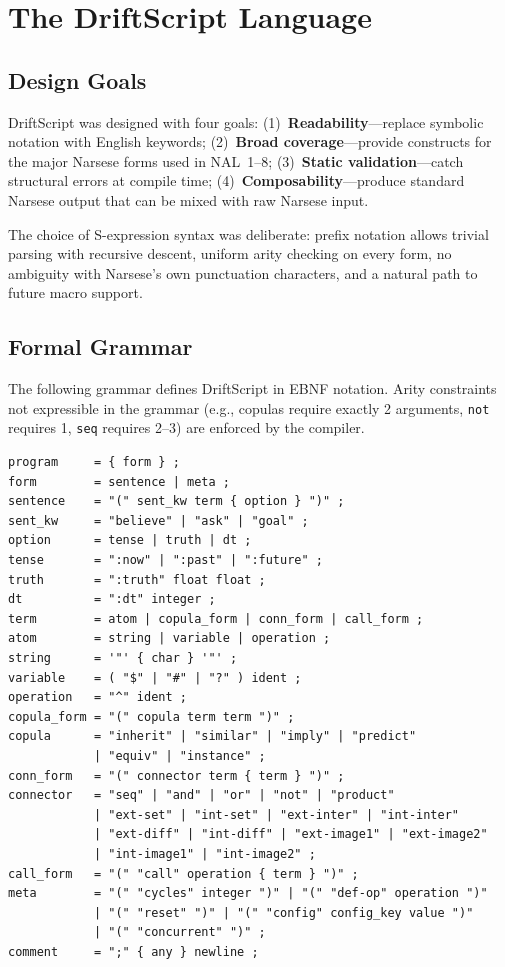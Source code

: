 \documentclass[11pt,a4paper]{article}
\begin{document}
\section{The DriftScript Language}
\label{sec:lang}

\subsection{Design Goals}

DriftScript was designed with four goals: (1)~\textbf{Readability}---replace
symbolic notation with English keywords; (2)~\textbf{Broad coverage}---provide
constructs for the major Narsese forms used in NAL~1--8;
(3)~\textbf{Static validation}---catch structural errors at compile time;
(4)~\textbf{Composability}---produce standard Narsese output that can be
mixed with raw Narsese input.

The choice of S-expression syntax was deliberate: prefix notation allows
trivial parsing with recursive descent, uniform arity checking on every form,
no ambiguity with Narsese's own punctuation characters, and a natural path to
future macro support.

\subsection{Formal Grammar}

The following grammar defines DriftScript in EBNF notation. Arity constraints
not expressible in the grammar (e.g., copulas require exactly 2 arguments,
\texttt{not} requires 1, \texttt{seq} requires 2--3) are enforced by the
compiler.

\begin{lstlisting}[language=EBNF,basicstyle=\footnotesize\ttfamily]
program     = { form } ;
form        = sentence | meta ;
sentence    = "(" sent_kw term { option } ")" ;
sent_kw     = "believe" | "ask" | "goal" ;
option      = tense | truth | dt ;
tense       = ":now" | ":past" | ":future" ;
truth       = ":truth" float float ;
dt          = ":dt" integer ;
term        = atom | copula_form | conn_form | call_form ;
atom        = string | variable | operation ;
string      = '"' { char } '"' ;
variable    = ( "$" | "#" | "?" ) ident ;
operation   = "^" ident ;
copula_form = "(" copula term term ")" ;
copula      = "inherit" | "similar" | "imply" | "predict"
            | "equiv" | "instance" ;
conn_form   = "(" connector term { term } ")" ;
connector   = "seq" | "and" | "or" | "not" | "product"
            | "ext-set" | "int-set" | "ext-inter" | "int-inter"
            | "ext-diff" | "int-diff" | "ext-image1" | "ext-image2"
            | "int-image1" | "int-image2" ;
call_form   = "(" "call" operation { term } ")" ;
meta        = "(" "cycles" integer ")" | "(" "def-op" operation ")"
            | "(" "reset" ")" | "(" "config" config_key value ")"
            | "(" "concurrent" ")" ;
comment     = ";" { any } newline ;
\end{lstlisting}
\end{document}
